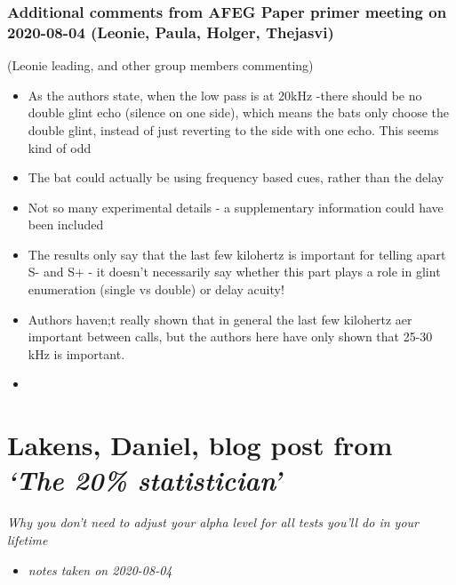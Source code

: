 \documentclass[
]{book}
\providecommand{\tightlist}{%
  \setlength{\itemsep}{0pt}\setlength{\parskip}{0pt}}
\begin{document}
\hypertarget{additional-comments-from-afeg-paper-primer-meeting-on-2020-08-04-leonie-paula-holger-thejasvi}{%
\subsection{Additional comments from AFEG Paper primer meeting on 2020-08-04 (Leonie, Paula, Holger, Thejasvi)}\label{additional-comments-from-afeg-paper-primer-meeting-on-2020-08-04-leonie-paula-holger-thejasvi}}

(Leonie leading, and other group members commenting)

\begin{itemize}
\tightlist
\item
  As the authors state, when the low pass is at 20kHz -there should be no
  double glint echo (silence on one side), which means the bats only choose the double glint,
  instead of just reverting to the side with one echo. This seems kind of odd
\item
  The bat could actually be using frequency based cues, rather than
  the delay
\item
  Not so many experimental details - a supplementary information could have been included
\item
  The results only say that the last few kilohertz is important for telling apart S- and S+ - it doesn't necessarily
  say whether this part plays a role in glint enumeration (single vs double) or delay acuity!
\item
  Authors haven;t really shown that in general the last few kilohertz aer important between calls, but the authors here have only shown that
  25-30 kHz is important.
\item
\end{itemize}

\hypertarget{lakens-daniel-blog-post-from-the-20-statistician}{%
\chapter{\texorpdfstring{Lakens, Daniel, blog post from \emph{`The 20\% statistician'}}{Lakens, Daniel, blog post from `The 20\% statistician'}}\label{lakens-daniel-blog-post-from-the-20-statistician}}


\emph{Why you don't need to adjust your alpha level for all tests you'll do in your lifetime} \citep{daniellakensa_2016}

\begin{itemize}
\tightlist
\item
  \emph{notes taken on 2020-08-04}
\end{itemize}
\end{document}
